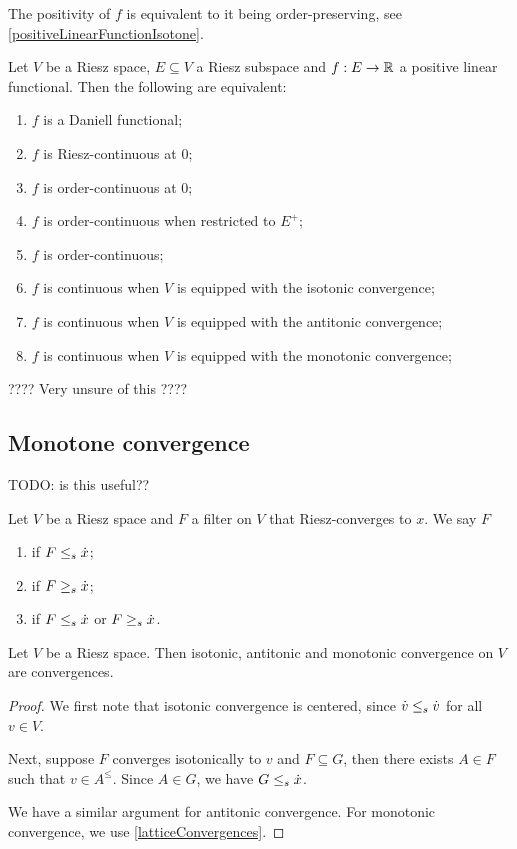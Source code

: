 The positivity of $f$ is equivalent to it being order-preserving, see \ref{positiveLinearFunctionIsotone}.

\begin{lemma}
Let $V$ be a Riesz space, $E\subseteq V$ a Riesz subspace and $f: E\to \mathbb{R}$ a positive linear functional. Then the following are equivalent:
\begin{enumerate}
\item $f$ is a Daniell functional;
\item $f$ is Riesz-continuous at $0$;
\item $f$ is order-continuous at $0$;
\item $f$ is order-continuous when restricted to $E^+$;
\item $f$ is order-continuous;
\item $f$ is continuous when $V$ is equipped with the isotonic convergence;
\item $f$ is continuous when $V$ is equipped with the antitonic convergence;
\item $f$ is continuous when $V$ is equipped with the monotonic convergence;
\end{enumerate}
\end{lemma}
???? Very unsure of this ????

\subsection{Monotone convergence}
TODO: is this useful??

\begin{definition}
Let $V$ be a Riesz space and $F$ a filter on $V$ that Riesz-converges to $x$. We say $F$
\begin{enumerate}
\item {} if $F \leq_s\dot{x}$;
\item {} if $F \geq_s\dot{x}$;
\item {} if $F \leq_s\dot{x}$ or $F \geq_s\dot{x}$.
\end{enumerate}
\end{definition}

\begin{lemma}
Let $V$ be a Riesz space. Then isotonic, antitonic and monotonic convergence on $V$ are convergences.
\end{lemma}
\begin{proof}
We first note that isotonic convergence is centered, since $\dot{v} \leq_s \dot{v}$ for all $v\in V$.

Next, suppose $F$ converges isotonically to $v$ and $F\subseteq G$, then there exists $A\in F$ such that $v \in A^\leq$. Since $A\in G$, we have $G\leq_s \dot{x}$.

We have a similar argument for antitonic convergence. For monotonic convergence, we use \ref{latticeConvergences}.
\end{proof}

